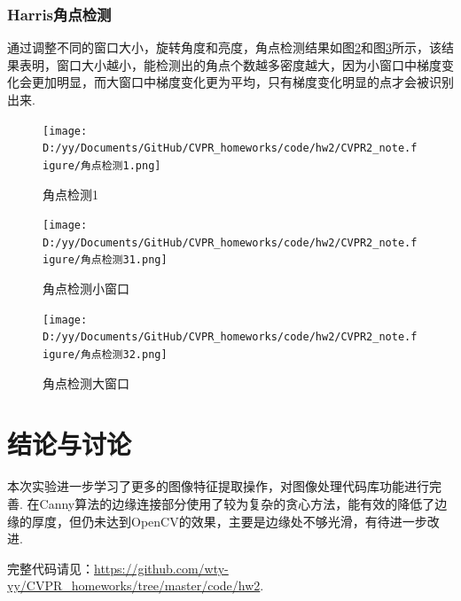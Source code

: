 \documentclass[12pt, a4paper, oneside]{ctexart}
\numberwithin{equation}{section}  %
\begin{document}
\subsubsection{Harris角点检测}
通过调整不同的窗口大小，旋转角度和亮度，角点检测结果如图\ref{fig-10}和图\ref{fig-11}所示，该结果表明，窗口大小越小，能检测出的角点个数越多密度越大，因为小窗口中梯度变化会更加明显，而大窗口中梯度变化更为平均，只有梯度变化明显的点才会被识别出来.

\begin{figure}[htbp]
    \centering
    \texttt{[image: D:/yy/Documents/GitHub/CVPR\_homeworks/code/hw2/CVPR2\_note.figure/角点检测1.png]}
    \caption{角点检测1\label{fig-9}}
\end{figure}

\begin{figure}[htbp]
    \centering
    \texttt{[image: D:/yy/Documents/GitHub/CVPR\_homeworks/code/hw2/CVPR2\_note.figure/角点检测31.png]}
    \caption{角点检测小窗口\label{fig-10}}
\end{figure}

\begin{figure}[htbp]
    \centering
    \texttt{[image: D:/yy/Documents/GitHub/CVPR\_homeworks/code/hw2/CVPR2\_note.figure/角点检测32.png]}
    \caption{角点检测大窗口\label{fig-11}}
\end{figure}
\vspace*{-1cm}
\section{结论与讨论}
本次实验进一步学习了更多的图像特征提取操作，对图像处理代码库功能进行完善. 在Canny算法的边缘连接部分使用了较为复杂的贪心方法，能有效的降低了边缘的厚度，但仍未达到OpenCV的效果，主要是边缘处不够光滑，有待进一步改进.

完整代码请见：\url{https://github.com/wty-yy/CVPR_homeworks/tree/master/code/hw2}.
\end{document}
